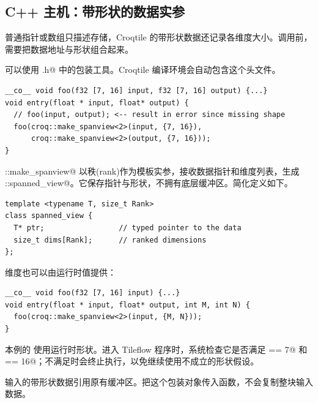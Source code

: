 \subsection*{C++ 主机：带形状的数据实参}

普通指针或数组只描述存储，Croqtile 的带形状数据还记录各维度大小。调用前，需要把数据地址与形状组合起来。

可以使用 \co@choreo.h@ 中的包装工具。Croqtile 编译环境会自动包含这个头文件。

\begin{lstlisting}[language=croqtile,caption={传入带形状的缓冲区}]
__co__ void foo(f32 [7, 16] input, f32 [7, 16] output) {...}
void entry(float * input, float* output) {
  // foo(input, output); <-- result in error since missing shape
  foo(croq::make_spanview<2>(input, {7, 16}),
      croq::make_spanview<2>(output, {7, 16}));
}
\end{lstlisting}

\co@croq::make_spanview@ 以秩(rank)作为模板实参，接收数据指针和维度列表，生成 \co@croq::spanned_view@。它保存指针与形状，不拥有底层缓冲区。简化定义如下。

\begin{lstlisting}[language=croqtile,caption={主机侧缓冲区包装器}]
template <typename T, size_t Rank>
class spanned_view {
  T* ptr;                 // typed pointer to the data
  size_t dims[Rank];      // ranked dimensions
};
\end{lstlisting}

维度也可以由运行时值提供：

\begin{lstlisting}[language=croqtile,caption={由运行时维度构造的调用}]
__co__ void foo(f32 [7, 16] input) {...}
void entry(float * input, float* output, int M, int N) {
  foo(croq::make_spanview<2>(input, {M, N}));
}
\end{lstlisting}

本例的 \co@input@ 使用运行时形状。进入 Tileflow 程序时，系统检查它是否满足 \co@M == 7@ 和 \co@N == 16@；不满足时会终止执行，以免继续使用不成立的形状假设。

输入的带形状数据引用原有缓冲区。把这个包装对象传入函数，不会复制整块输入数据。

